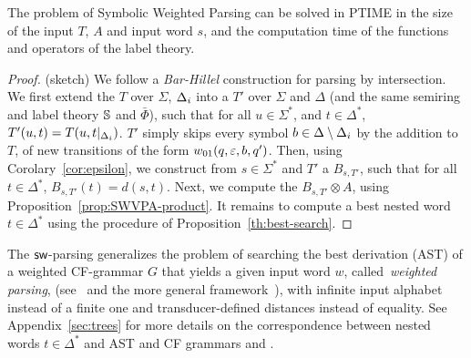 %
%
\begin{proposition}
The problem of Symbolic Weighted Parsing
can be solved in PTIME in the size of the input \SWT $T$, \SWVPA $A$
and input word $s$,
and the computation time of the functions and operators of the label theory.
\end{proposition}
%
\begin{proof} (sketch)
We follow a \emph{Bar-Hillel} construction for parsing by intersection.
%
\noindent
We first extend the \SWT $T$ over $\Sigma$, $\Deltai$
into a \SWT $T'$ over $\Sigma$ and $\Delta$
(and the same semiring and label theory $\mathbb{S}$ and $\bar\Phi$),
such that for all $u \in \Sigma^*$, and $t \in {\Delta}^*$,
$T'(u, t) = T(u, t|_{\Deltai})$.
%
$T'$ simply skips every symbol
$b \in {\Delta} \setminus \Deltai$
by the addition to $T$,
of new transitions of the form $\wei_{01}(q, \varepsilon, b, q')$.
%
\noindent
Then, using Corolary~\ref{cor:epsilon},
we construct from $s \in \Sigma^*$ and $T'$
a \SWA $B_{s, T'}$,
such that for all $t \in \Delta^*$, $B_{s, T'}(t) = d(s, t)$.
%
%
\noindent
Next, %
we compute the \SWVPA $B_{s, T'} \otimes A$,
using Proposition~\ref{prop:SWVPA-product}.
%
\noindent
It remains to compute a best nested word $t \in {\Delta}^*$
using the procedure of Proposition~\ref{th:best-search}.
\end{proof}

The $\textsf{sw}$-parsing generalizes
the problem of searching the best derivation (AST) of a weighted CF-grammar $G$
that yields a given input word $w$, called~\emph{weighted parsing},
(see~\cite{Goodman99SemiringParsing}
 and the more general framework~\cite{MorbitzVogler19weighted-parsing}),
with infinite input alphabet instead of a finite one and
transducer-defined distances instead of equality. 
%
See Appendix~\ref{sec:trees} for more details on the correspondence between 
nested words $t \in \Delta^*$ and AST and CF grammars and \SWVPA.

